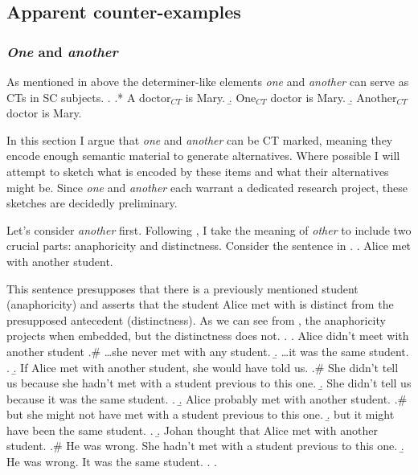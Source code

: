 \documentclass[
	letterpaper,
]{article}
\begin{document}
\subsection{Apparent counter-examples}
\subsubsection{\textit{One} and \textit{another}}
As mentioned in above the determiner-like elements \textit{one} and \textit{another} can serve as CTs in SC subjects.
\ex.\label{ex:AONeAnother}
\a.* A doctor$_{CT}$ is Mary.
\b.\label{ex:OneCT} One$_{CT}$ doctor is Mary.
\b.\label{ex:AnotherCT} Another$_{CT}$ doctor is Mary.

In this section I argue that \textit{one} and \textit{another} can be CT marked, meaning they encode enough semantic material to generate alternatives.
Where possible I will attempt to sketch what is encoded by these items and what their alternatives might be.
Since \textit{one} and \textit{another} each warrant a dedicated research project, these sketches are decidedly preliminary.

Let's consider \textit{another} first.
Following \textcite{heim1991reciprocity}, I take the meaning of  \textit{other} to include two crucial parts: anaphoricity and distinctness.
Consider the sentence in \Next.
\ex. Alice met with another student.

This sentence presupposes that there is a previously mentioned student (anaphoricity) and asserts that the student Alice met with is distinct from the presupposed antecedent (distinctness). 
As we can see from \Next, the anaphoricity projects when embedded, but the distinctness does not.
\ex.
\a. Alice didn't meet with another student
\a.\# \dots she never met with any student.
\b. \dots it was the same student.
\z.
\b. If Alice met with another student, she would have told us.
\a.\# She didn't tell us because she hadn't met with a student previous to this one.
\b. She didn't tell us because it was the same student.
\z.
\b. Alice probably met with another student.
\a.\# but she might not have met with a student previous to this one.
\b. but it might have been the same student. 
\z.
\b. Johan thought that Alice met with another student.
\a.\# He was wrong. She hadn't met with a student previous to this one.
\b. He was wrong. It was the same student.
\z.
\z.
\end{document}
